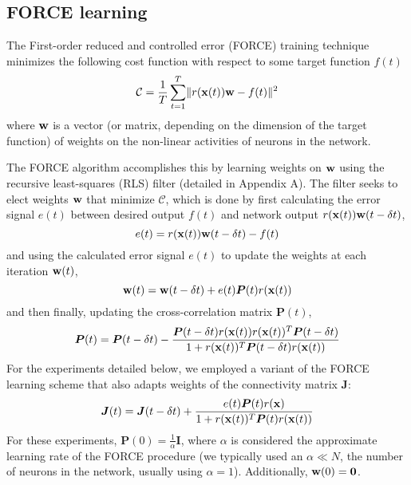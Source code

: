 \documentclass[12pt,a4paper,final]{iopart}
\begin{document}
\subsection{FORCE learning}
The First-order reduced and controlled error (FORCE) training technique minimizes the following cost function with respect to some target function $f(t)$
\begin{equation*}
    \mathcal{C} = \frac{1}{T} \sum_{t = 1}^T \lVert r({\bf x}(t)){\bf w} - f(t) \rVert^2
\end{equation*}
where ${\bf w}$ is a vector (or matrix, depending on the dimension of the target function) of weights on the non-linear activities of neurons in the network.

The FORCE algorithm accomplishes this by learning weights on ${\bf w}$ using the recursive least-squares (RLS) filter (detailed in Appendix A). The filter seeks to elect weights ${\bf w}$ that minimize $\mathcal{C}$, which is done by first calculating the error signal $e(t)$ between desired output $f(t)$ and network output $r({\bf x}(t)){\bf w}(t - \delta t)$,
\[
    e(t) = r({\bf x}(t)){\bf w}(t - \delta t) - f(t)
\]
and using the calculated error signal $e(t)$ to update the weights at each iteration ${\bf w}(t)$,
\[
    {\bf w}(t) = {\bf w}(t - \delta t) + e(t)\boldsymbol{P}(t)r({\bf x}(t))
\]
and then finally, updating the cross-correlation matrix $\boldsymbol{P}(t)$,
\[
    \boldsymbol{P}(t) = \boldsymbol{P}(t - \delta t) - \frac{\boldsymbol{P}(t-\delta t)r({\bf x}(t)) r({\bf x}(t))^T \boldsymbol{P}(t-\delta t)}{1 + r({\bf x}(t))^T\boldsymbol{P}(t-\delta t)r({\bf x}(t))}
\]
For the experiments detailed below, we employed a variant of the FORCE learning scheme that also adapts weights of the connectivity matrix $\boldsymbol{J}$:
\[
    \boldsymbol{J}(t) = \boldsymbol{J}(t - \delta t) + \frac{e(t)\boldsymbol{P}(t)r({\bf x})}{1 + r({\bf x}(t))^T\boldsymbol{P}(t)r({\bf x}(t))}
\]
For these experiments, $\boldsymbol{P}(0) = \frac{1}{\alpha} \boldsymbol{I}$, where $\alpha$ is considered the approximate learning rate of the FORCE procedure (we typically used an $\alpha \ll N$, the number of neurons in the network, usually using $\alpha = 1$). Additionally, ${\bf w}(0) = \boldsymbol{0}$. 
\end{document}

